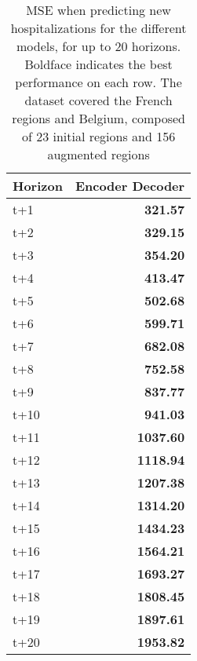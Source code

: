 \begin{table}[H]
\centering
\caption{MSE when predicting new hospitalizations for the different models, for up to 20 horizons. Boldface indicates the best performance on each row. The dataset covered the French regions and Belgium, composed of 23 initial regions and 156 augmented regions }
\label{tab:MSE_comparison}
\begin{tabular}{lr}
\toprule
Horizon &  Encoder Decoder \\
\midrule
t+1  & \textbf{321.57}  \\
t+2  & \textbf{329.15}  \\
t+3  & \textbf{354.20}  \\
t+4  & \textbf{413.47}  \\
t+5  & \textbf{502.68}  \\
t+6  & \textbf{599.71}  \\
t+7  & \textbf{682.08}  \\
t+8  & \textbf{752.58}  \\
t+9  & \textbf{837.77}  \\
t+10  & \textbf{941.03}  \\
t+11  & \textbf{1037.60}  \\
t+12  & \textbf{1118.94}  \\
t+13  & \textbf{1207.38}  \\
t+14  & \textbf{1314.20}  \\
t+15  & \textbf{1434.23}  \\
t+16  & \textbf{1564.21}  \\
t+17  & \textbf{1693.27}  \\
t+18  & \textbf{1808.45}  \\
t+19  & \textbf{1897.61}  \\
t+20  & \textbf{1953.82}  \\

\bottomrule
\end{tabular}
\end{table}
